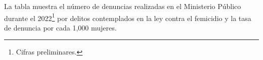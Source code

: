 La tabla muestra el número de denuncias realizadas en el Ministerio Público durante el 2022\footnote{Cifras preliminares.} por delitos contemplados en la ley contra el femicidio y la tasa de denuncia por cada 1,000 mujeres. 